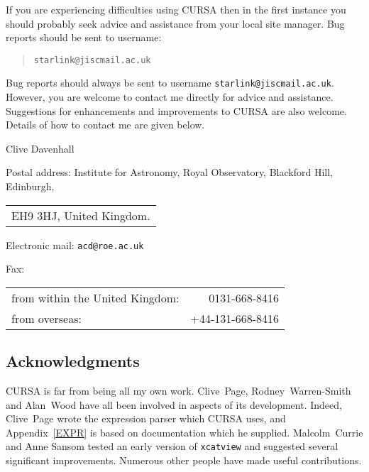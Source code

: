 \documentclass[twoside,11pt]{starlink}
\begin{document}
If you are experiencing difficulties using CURSA then in the first
instance you should probably seek advice and assistance from your local
site manager.  Bug reports should be sent to username:

\begin{quote}
\texttt{starlink@jiscmail.ac.uk}
\end{quote}

Bug reports should always be sent to username \texttt{starlink@jiscmail.ac.uk}.
However, you are welcome to contact me directly for advice and assistance.
Suggestions for enhancements and improvements to CURSA are also
welcome.  Details of how to contact me are given below.
\begin{flushright}
Clive Davenhall \\
\end{flushright}

\vspace{3mm}

Postal address: Institute for Astronomy, Royal Observatory, Blackford Hill,
Edinburgh, \\
\begin{tabular}{l}
EH9 3HJ, United Kingdom.  \\
\end{tabular}

\vspace{4mm}

Electronic mail: \texttt{acd@roe.ac.uk}

\vspace{4mm}

Fax: \\
\begin{tabular}{lr}
from within the United Kingdom: &    0131-668-8416 \\
from overseas:                  & +44-131-668-8416 \\
\end{tabular}


\newpage
\subsection*{Acknowledgments}

CURSA is far from being all my own work. Clive~Page, Rodney~Warren-Smith
and Alan~Wood have all been involved in aspects of its development.
Indeed, Clive~Page wrote the expression parser which CURSA uses, and
Appendix~\ref{EXPR} is based on documentation which he supplied.
Malcolm~Currie and Anne Sansom tested an early version of \texttt{xcatview}
and suggested several significant improvements. Numerous other people have
made useful contributions.
\end{document}
